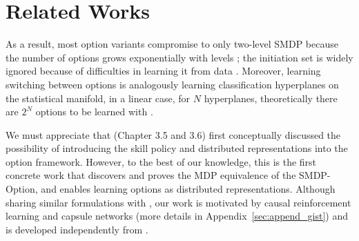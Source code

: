 \documentclass{article}
\begin{document}
\section{Related Works}
\label{sec:review}

As a result, most option variants compromise to only two-level
SMDP because the number of options grows exponentially with
levels \cite{riemer2018learning}; the initiation set is widely
ignored because of difficulties in learning it from data
\cite{khetarpal2020options}. Moreover, learning switching
between options is analogously learning classification
hyperplanes on the statistical manifold, in a linear case, for
$N$ hyperplanes, theoretically there are $2^N$ options to be
learned with \cite{mankowitz2016adaptive}.


We must appreciate that  (Chapter 3.5
and 3.6) first conceptually discussed the possibility of
introducing the skill policy and distributed representations into
the option framework. However, to the best of our knowledge, this
is the first concrete work that discovers and proves the MDP
equivalence of the SMDP-Option, and enables learning options as
distributed representations. Although sharing similar
formulations with \cite{bacon2018temporal}, our work is motivated
by causal reinforcement learning
\cite{peters2016causal,doshi2016hidden} and capsule networks
\cite{sabour2017dynamic} (more details in
Appendix~\ref{sec:append_gist}) and is developed independently
from \cite{bacon2018temporal}.
\end{document}
